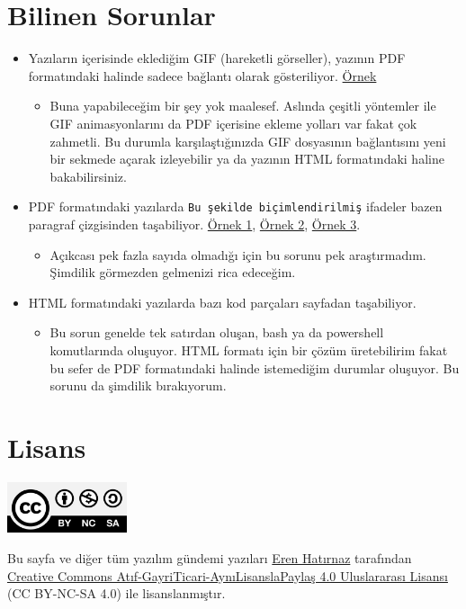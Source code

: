 \documentclass[11pt]{article}
\begin{document}
\section*{Bilinen Sorunlar}
\label{sec:org1ff8adc}
\begin{itemize}
\item Yazıların içerisinde eklediğim GIF (hareketli görseller), yazının PDF
formatındaki halinde sadece bağlantı olarak gösteriliyor. \href{img/pdf-gif-link-sorun.png}{Örnek}
\begin{itemize}
\item Buna yapabileceğim bir şey yok maalesef. Aslında çeşitli yöntemler ile GIF
animasyonlarını da PDF içerisine ekleme yolları var fakat çok zahmetli. Bu
durumla karşılaştığınızda GIF dosyasının bağlantısını yeni bir sekmede
açarak izleyebilir ya da yazının HTML formatındaki haline bakabilirsiniz.
\end{itemize}
\item PDF formatındaki yazılarda \texttt{Bu şekilde biçimlendirilmiş} ifadeler bazen
paragraf çizgisinden taşabiliyor. \href{img/paragraf-tasma-sorunu-1.png}{Örnek 1}, \href{img/paragraf-tasma-sorunu-2.png}{Örnek 2}, \href{img/paragraf-tasma-sorunu-3.png}{Örnek 3}.
\begin{itemize}
\item Açıkcası pek fazla sayıda olmadığı için bu sorunu pek araştırmadım.
Şimdilik görmezden gelmenizi rica edeceğim.
\end{itemize}
\item HTML formatındaki yazılarda bazı kod parçaları sayfadan taşabiliyor.
\begin{itemize}
\item Bu sorun genelde tek satırdan oluşan, bash ya da powershell komutlarında
oluşuyor. HTML formatı için bir çözüm üretebilirim fakat bu sefer de PDF
formatındaki halinde istemediğim durumlar oluşuyor. Bu sorunu da şimdilik
bırakıyorum.
\end{itemize}
\end{itemize}
\section*{Lisans}
\label{sec:org3a627ef}
\begin{center}
\begin{center}
\includegraphics[height=1.5cm]{img/CC_BY-NC-SA_4.0.png}
\end{center}

Bu sayfa ve diğer tüm yazılım gündemi yazıları \href{https://erenhatirnaz.github.io}{Eren Hatırnaz} tarafından
\href{http://creativecommons.org/licenses/by-nc-sa/4.0/}{Creative Commons Atıf-GayriTicari-AynıLisanslaPaylaş 4.0 Uluslararası Lisansı}
(CC BY-NC-SA 4.0) ile lisanslanmıştır.
\end{center}
\end{document}
